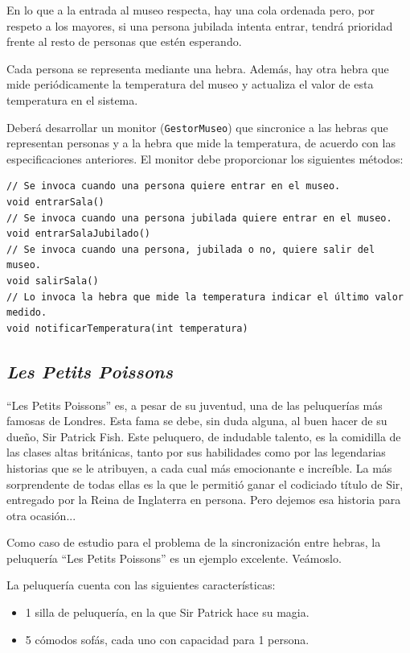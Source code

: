 \documentclass[a4paper]{article}
\newcommand{\code}[1]{\texttt{#1}}
\begin{document}
En lo que a la entrada al museo respecta, hay una cola ordenada pero, por respeto a los mayores, si una persona jubilada intenta entrar, tendrá prioridad frente al resto de personas que estén esperando.

Cada persona se representa mediante una hebra. Además, hay otra hebra que mide periódicamente la temperatura del museo y actualiza el valor de esta temperatura en el sistema.

Deberá desarrollar un monitor (\code{GestorMuseo}) que sincronice a las hebras que representan personas y a la hebra que mide la temperatura, de acuerdo con las especificaciones anteriores. El monitor debe proporcionar los siguientes métodos:

\begin{verbatim}
// Se invoca cuando una persona quiere entrar en el museo.
void entrarSala()
// Se invoca cuando una persona jubilada quiere entrar en el museo.
void entrarSalaJubilado()
// Se invoca cuando una persona, jubilada o no, quiere salir del museo.
void salirSala()
// Lo invoca la hebra que mide la temperatura indicar el último valor medido.
void notificarTemperatura(int temperatura)
\end{verbatim}

\subsection{\textit{Les Petits Poissons}}

``Les Petits Poissons'' es, a pesar de su juventud, una de las peluquerías más famosas de Londres. Esta fama se debe, sin duda alguna, al buen hacer de su dueño, Sir Patrick Fish. Este peluquero, de indudable talento, es la comidilla de las clases altas británicas, tanto por sus habilidades como por las legendarias historias que se le atribuyen, a cada cual más emocionante e increíble. La más sorprendente de todas ellas es la que le permitió ganar el codiciado título de Sir, entregado por la Reina de Inglaterra en persona. Pero dejemos esa historia para otra ocasión...

Como caso de estudio para el problema de la sincronización entre hebras, la peluquería ``Les Petits Poissons'' es un ejemplo excelente. Veámoslo.

La peluquería cuenta con las siguientes características:

\begin{itemize}
    \item 1 silla de peluquería, en la que Sir Patrick hace su magia.
    \item 5 cómodos sofás, cada uno con capacidad para 1 persona.
\end{itemize}
\end{document}

